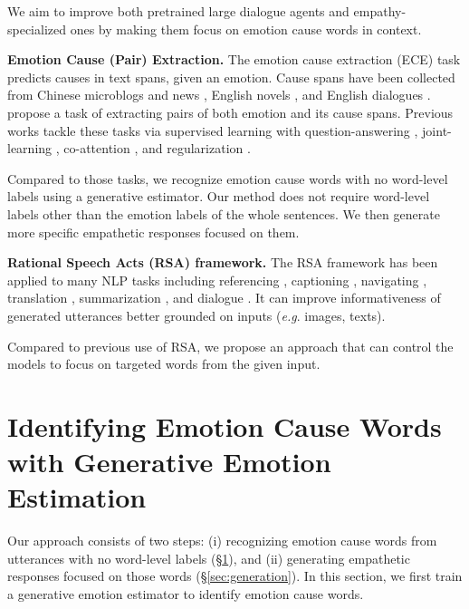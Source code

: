\documentclass[11pt]{article}
\makeatletter
\DeclareRobustCommand\onedot{\futurelet\@let@token\@onedot}
\def\onedot{. }
\def\eg{\emph{e.g}\onedot} \def\Eg{\emph{E.g}\onedot}
\makeatother
\begin{document}
We aim to improve both pretrained large dialogue agents and empathy-specialized ones by making them focus on emotion cause words in context.





\textbf{Emotion Cause (Pair) Extraction.}
The emotion cause extraction (ECE) task predicts causes in text spans, given an emotion.
Cause spans have been collected from Chinese microblogs and news \citep{Gui:2014:NLPCC, Gui:2016:EMNLP},
English novels \citep{Gao:2017:NTCIR}, and English dialogues \citep{Poria:2020:arxiv}.
\citet{Xia:2019:ACL} propose a task of extracting pairs of both emotion and its cause spans.
Previous works tackle these tasks via supervised learning with question-answering \citep{Gui:2017:EMNLP},
joint-learning \citep{Chen:2018:EMNLP}, co-attention \citep{Li:2018:EMNLP}, and regularization \citep{Fan:2019:EMNLP}.


Compared to those tasks, we recognize emotion cause words with no word-level labels using a generative estimator.
Our method does not require word-level labels other than the emotion labels of the whole sentences.
We then generate more specific empathetic responses focused on them.


\textbf{Rational Speech Acts (RSA) framework.}
The RSA framework \citep{Frank:2012:Science} has been applied to many NLP tasks including
referencing \cite{Andreas:2016:EMNLP, Zarriess:2019:ACL}, captioning \cite{Vedantam:2017:CVPR, Cohn:2018:NAACL},
navigating \cite{Fried:2018:NeurIPS}, translation \cite{Cohn:2019:NAACL}, summarization \cite{Shen:2019:NAACL}, and dialogue \citep{Kim:2020:EMNLP}.
It can improve informativeness of generated utterances better grounded on inputs (\eg images, texts).

Compared to previous use of RSA, we propose an approach that can control the models to focus on targeted words from the given input.






\section{Identifying Emotion Cause Words \newline with Generative Emotion Estimation}
\label{sec:gee}

Our approach consists of two steps: (i)  recognizing emotion cause words from utterances with no word-level labels (\S \ref{sec:gee}), and
(ii) generating empathetic responses focused on those words (\S \ref{sec:generation}).
In this section, we first train a generative emotion estimator to identify emotion cause words.
\end{document}
